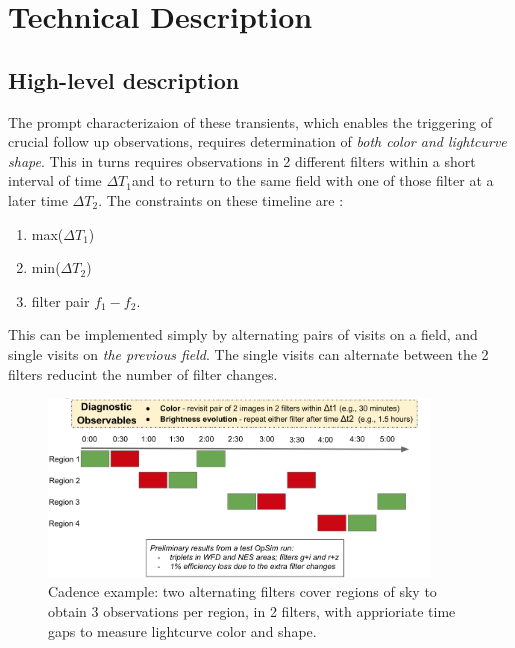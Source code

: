 \documentclass[11pt]{article}
\newcommand{\dtone}{\ensuremath{\Delta T_1}}
\newcommand{\dttwo}{\ensuremath{\Delta T_2}}
\begin{document}
\clearpage
\section{Technical Description}

\subsection{High-level description}

The prompt characterizaion of these transients, which enables the triggering of crucial follow up observations, requires determination of \emph{both color and lightcurve shape}. This in turns requires observations in 2 different filters within a short interval of time \dtone  and to return to the same field with one of those filter at a later time \dttwo.  The constraints on these timeline are :
\begin{enumerate}
    \item max(\dtone )
    \item min(\dttwo )
    \item filter pair $f_1-f_2$.
\end{enumerate}
This can be implemented simply by alternating pairs of visits on a field, and single visits on \emph{the previous field}. The single visits can alternate between the 2 filters reducint the number of filter changes.

\begin{figure}[!h]
\includegraphics[width=0.9\textwidth]{figures/highLevelCadence.png}
\caption{Cadence example: two alternating filters cover regions of sky to obtain 3 observations per region, in 2 filters, with apprioriate time gaps to measure lightcurve color and shape.}
\end{figure}
\end{document}
